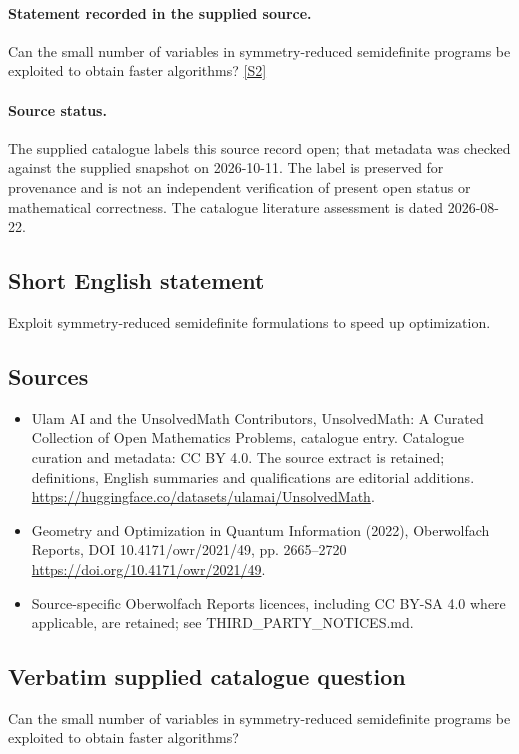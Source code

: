 \documentclass[11pt]{article}
\begin{document}
\paragraph{Statement recorded in the supplied source.}
Can the small number of variables in symmetry-reduced semidefinite programs be exploited to obtain faster algorithms? \href{https://doi.org/10.4171/owr/2021/49}{[S2]}
\paragraph{Source status.}
The supplied catalogue labels this source record open; that metadata was checked against the supplied snapshot on 2026-10-11. The label is preserved for provenance and is not an independent verification of present open status or mathematical correctness. The catalogue literature assessment is dated 2026-08-22.
\subsection{Short English statement}
Exploit symmetry-reduced semidefinite formulations to speed up optimization.
\subsection{Sources}
\begin{itemize}
\item[S1] Ulam AI and the UnsolvedMath Contributors, UnsolvedMath: A Curated Collection of Open Mathematics Problems, catalogue entry. Catalogue curation and metadata: CC BY 4.0. The source extract is retained; definitions, English summaries and qualifications are editorial additions.
\url{https://huggingface.co/datasets/ulamai/UnsolvedMath}.
\item[S2] Geometry and Optimization in Quantum Information (2022), Oberwolfach Reports, DOI 10.4171/owr/2021/49, pp. 2665--2720
\url{https://doi.org/10.4171/owr/2021/49}.
\item Source-specific Oberwolfach Reports licences, including CC BY-SA 4.0 where applicable, are retained; see THIRD\_PARTY\_NOTICES.md.
\end{itemize}
\subsection{Verbatim supplied catalogue question}
Can the small number of variables in symmetry-reduced semidefinite programs be exploited to obtain faster algorithms?
\end{document}
